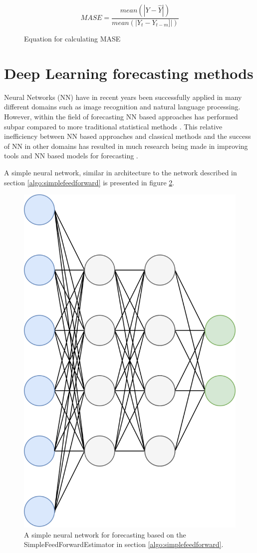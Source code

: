 \begin{figure}[h]
  \[MASE = \frac{mean(|Y - \hat{Y}|)}{mean(|Y_t - Y_{t-m}]|)}\]
  \caption{Equation for calculating MASE}
  \label{eq:MASE}
\end{figure}

\section{Deep Learning forecasting methods}
\label{sec:deep_learning_methods}
Neural Networks (NN) have in recent years been successfully applied in many different domains such as image recognition and natural language processing. However, within the field of forecasting NN based approaches has performed subpar compared to more traditional statistical methods \cite{m3_competition,makridakis_m4_2020,oreshkin_n_beats_2020, other_thesis}. This relative inefficiency between NN based approaches and classical methods and the success of NN in other domains has resulted in much research being made in improving tools and NN based models for forecasting \cite{gluonts_paper}.

A simple neural network, similar in architecture to the network described in section \ref{algo:simplefeedforward} is presented in figure \ref{fig:simplefeedforward}.

\begin{figure}[htb]
  \centering
  \includegraphics[width=0.5\linewidth]{./img/simplefeedforward.png}
  \caption{A simple neural network for forecasting based on the SimpleFeedForwardEstimator in section \ref{algo:simplefeedforward}.}
  \label{fig:simplefeedforward}
\end{figure}
\clearpage

